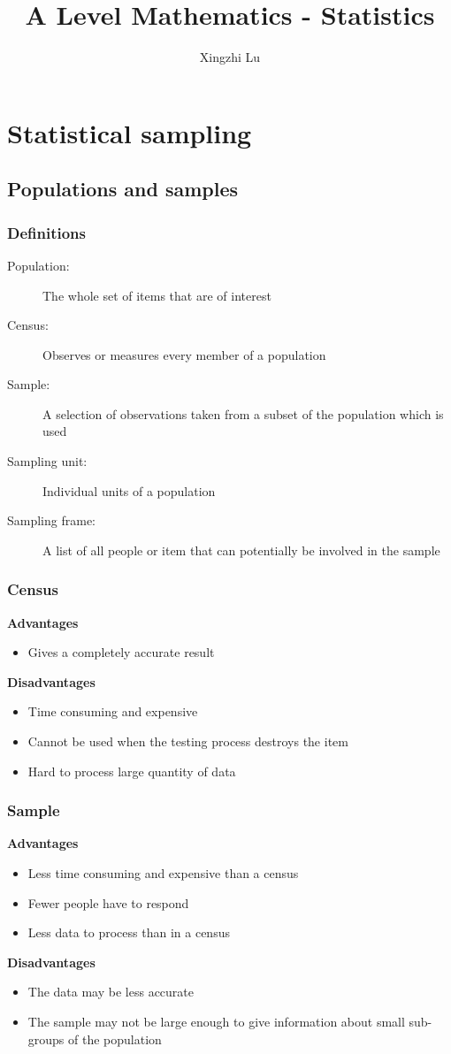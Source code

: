 \documentclass[A4paper]{article}
\title{A Level Mathematics - Statistics}
\author{Xingzhi Lu}
\begin{document}
	\maketitle
	\section{Statistical sampling}
	\subsection{Populations and samples}
	\subsubsection{Definitions}
	\begin{description}
		\item[Population:] The whole set of items that are of interest
		\item[Census:] Observes or measures every member of a population
		\item[Sample:] A selection of observations taken from a subset of the population which is used
		\item[Sampling unit:] Individual units of a population
		\item[Sampling frame:] A list of all people or item that can potentially be involved in the sample
	\end{description}
	
	\subsubsection{Census}
	\textbf{Advantages}
	\begin{itemize}
		\item Gives a completely accurate result
	\end{itemize}
	\textbf{Disadvantages}
	\begin{itemize}
		\item Time consuming and expensive
		\item Cannot be used when the testing process destroys the item
		\item Hard to process large quantity of data
	\end{itemize}
	\subsubsection{Sample}
	\textbf{Advantages}
	\begin{itemize}
		\item Less time consuming and expensive than a census
		\item Fewer people have to respond
		\item Less data to process than in a census
	\end{itemize}
	\textbf{Disadvantages}
	\begin{itemize}
		\item The data may be less accurate
		\item The sample may not be large enough to give information about small sub-groups of the population
	\end{itemize}
	
\end{document}

